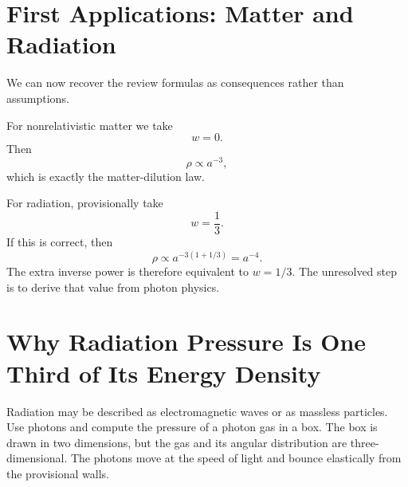 \section{First Applications: Matter and Radiation}

We can now recover the review formulas as consequences rather than assumptions.

For nonrelativistic matter we take
\begin{equation}
w=0.
\end{equation}
Then
\begin{equation}
\rho\propto a^{-3},
\end{equation}
which is exactly the matter-dilution law.

For radiation, provisionally take
\begin{equation}
w=\frac13.
\end{equation}
If this is correct, then
\begin{equation}
\rho\propto a^{-3(1+1/3)}=a^{-4}.
\end{equation}
The extra inverse power is therefore equivalent to \(w=1/3\). The unresolved step is to derive that value from photon physics.

\section{Why Radiation Pressure Is One Third of Its Energy Density}

Radiation may be described as electromagnetic waves or as massless particles. Use photons and compute the pressure of a photon gas in a box. The box is drawn in two dimensions, but the gas and its angular distribution are three-dimensional. The photons move at the speed of light and bounce elastically from the provisional walls.


